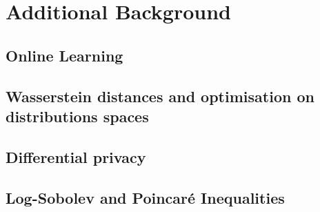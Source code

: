 \chapter{Additional Background}
\label{app:chap_1}


\section{Online Learning}

\section{Wasserstein distances and optimisation on distributions spaces}

\section{Differential privacy}

\section{Log-Sobolev and Poincaré Inequalities}
